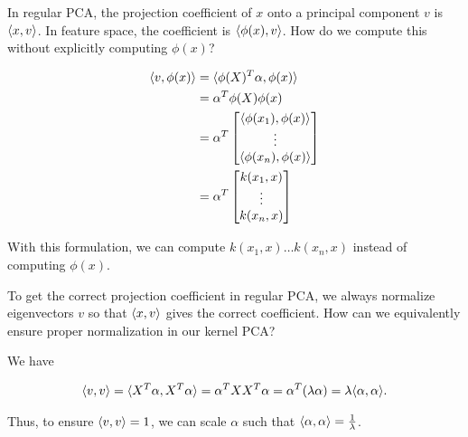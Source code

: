\begin{Parts}
\begin{solution}
\end{solution}

\Part In regular PCA, the projection coefficient of $x$ onto a principal component $v$ is $\langle x,v\rangle$. In feature space, the coefficient is $\langle \phi(x),v\rangle$. How do we compute this without explicitly computing $\phi(x)$?

\begin{solution}

\begin{align*}
\langle v,\phi(x)\rangle &= \langle \phi(X)^T \alpha,\phi(x)\rangle \\
&= \alpha^T \phi(X) \phi(x) \\
&= \alpha^T \begin{bmatrix} \langle \phi(x_1),\phi(x)\rangle \\ \vdots \\ \langle \phi(x_n),\phi(x)\rangle \end{bmatrix} \\ 
&= \alpha^T \begin{bmatrix} k(x_1, x) \\ \vdots \\ k(x_n, x) \end{bmatrix} \\
\end{align*}

With this formulation, we can compute $k(x_1, x) \ldots k(x_n, x)$ instead of computing $\phi(x)$.

\end{solution}

\Part To get the correct projection coefficient in regular PCA, we always normalize eigenvectors $v$ so that $\langle x,v\rangle$ gives the correct coefficient. How can we equivalently ensure proper normalization in our kernel PCA?

\begin{solution}

We have 

\begin{align*}
\langle v,v\rangle = \langle X^T \alpha,X^T \alpha\rangle = \alpha^T X X^T \alpha = \alpha^T (\lambda \alpha) = \lambda \langle \alpha,\alpha\rangle.
\end{align*}

Thus, to ensure $\langle v,v\rangle = 1$, we can scale $\alpha$ such that $\langle \alpha,\alpha\rangle = \frac{1}{\lambda}$.

\end{solution}

\end{Parts}

\newpage